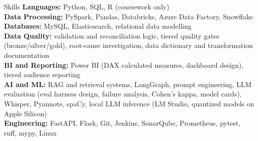 \documentclass{resume}
\begin{document}
\begin{rSection}{Skills}
\vspace{0.4em}
\textbf{Languages:} Python, SQL, R (coursework only) \\
\textbf{Data Processing:} PySpark, Pandas, Databricks, Azure Data Factory, Snowflake \\
\textbf{Databases:} MySQL, Elasticsearch, relational data modelling \\
\textbf{Data Quality:} validation and reconciliation logic, tiered quality gates (bronze/silver/gold), root-cause investigation, data dictionary and transformation documentation \\
\textbf{BI and Reporting:} Power BI (DAX calculated measures, dashboard design), tiered audience reporting \\
\textbf{AI and ML:} RAG and retrieval systems, LangGraph, prompt engineering, LLM evaluation (eval harness design, failure analysis, Cohen's kappa, model cards), Whisper, Pyannote, spaCy, local LLM inference (LM Studio, quantized models on Apple Silicon) \\
\textbf{Engineering:} FastAPI, Flask, Git, Jenkins, SonarQube, Prometheus, pytest, ruff, mypy, Linux 
\end{rSection}
\end{document}
